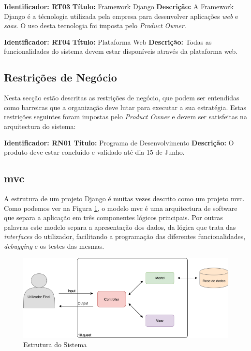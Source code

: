 \textbf{Identificador: RT03}
\newline
\textbf{Título:} Framework Django\cite{django}
\newline
\textbf{Descrição:} A Framework Django é a técnologia utilizada pela empresa para desenvolver aplicações \textit{web} e \textit{\acrshort{saas}}. O uso desta tecnologia foi imposta pelo \textit{Product Owner}.

\textbf{Identificador: RT04}
\newline
\textbf{Título:} Plataforma Web
\newline
\textbf{Descrição:} Todas as funcionalidades do sistema devem estar disponíveis através da plataforma web.

\subsection{Restrições de Negócio}
Nesta secção estão descritas as restrições de negócio, que podem ser entendidas como barreiras que a organização deve lutar para executar a sua estratégia. Estas restrições seguintes foram impostas pelo \textit{Product Owner} e devem ser satisfeitas na arquitectura do sistema:

\textbf{Identificador: RN01}
\newline
\textbf{Título:} Programa de Desenvolvimento
\newline
\textbf{Descrição:} O produto deve estar concluído e validado até dia 15 de Junho.



\subsection{\acrfull{mvc}}

A estrutura de um projeto Django é muitas vezes descrito como um projeto \acrshort{mvc}. Como podemos ver na Figura \ref{fig:arq-mvc}, o modelo \acrshort{mvc} é uma arquitectura de software que separa a aplicação em três componentes lógicos principais. Por outras palavras este modelo separa a apresentação dos dados, da lógica que trata das \textit{interfaces} do utilizador, facilitando a programação das diferentes funcionalidades, \textit{debugging} e os testes das mesmas.

\begin{figure}[ht!]
	\begin{center}
		\includegraphics[width=1\textwidth]{img/arq/diagrama-MVC}
		\caption{Estrutura do Sistema}
		\label{fig:arq-mvc}
	\end{center}
\end{figure}

